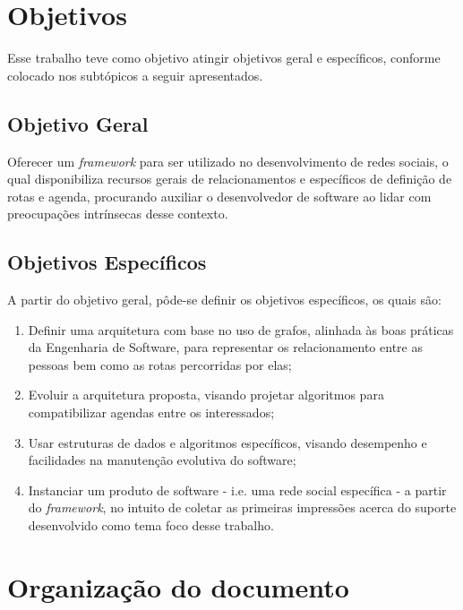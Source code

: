 \section*{Objetivos}

Esse trabalho teve como objetivo atingir objetivos geral e específicos, conforme colocado nos subtópicos a seguir apresentados.

\subsection*{Objetivo Geral}

Oferecer um \textit{framework} para ser utilizado no desenvolvimento de redes sociais, o qual disponibiliza recursos gerais de relacionamentos e específicos de definição de rotas e agenda, procurando auxiliar o desenvolvedor de software ao lidar com preocupações intrínsecas desse contexto.

\subsection*{Objetivos Específicos}

A partir do objetivo geral, pôde-se definir os objetivos específicos, os quais são:

\begin{enumerate}
	\item Definir uma arquitetura com base no uso de grafos, alinhada às boas práticas da Engenharia de Software, para representar os relacionamento entre as pessoas bem como as rotas percorridas por elas;
	\item Evoluir a arquitetura proposta, visando projetar algoritmos para compatibilizar agendas entre os interessados;
	\item Usar estruturas de dados e algoritmos específicos, visando desempenho e facilidades na manutenção evolutiva do software;
	\item Instanciar um produto de software - i.e. uma rede social específica - a partir do \textit{framework}, no intuito de coletar as primeiras impressões acerca do suporte desenvolvido como tema foco desse trabalho.
\end{enumerate}

\section*{Organização do documento}

